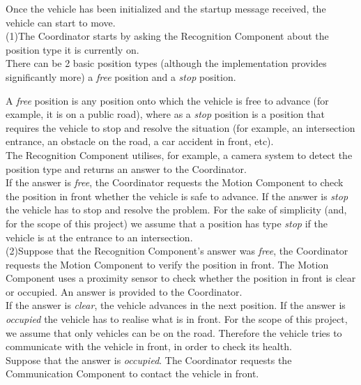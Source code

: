 \documentclass{memoir}
\begin{document}
Once the vehicle has been initialized and the startup message received, the vehicle can start to move. 
\\

(1)The Coordinator starts by asking the Recognition Component about the position type it is currently on. 
\\

There can be 2 basic position types (although the implementation provides significantly more) a \textit{free} position and a \textit{stop} position.

A \textit{free} position is any position onto which the vehicle is free to advance (for example, it is on a public road), where as a \textit{stop} position is a position that requires the vehicle to stop and resolve the situation (for example, an intersection entrance, an obstacle on the road, a 
car accident in front, etc).
\\

The Recognition Component utilises, for example, a camera system to detect the position type and returns an answer to the Coordinator.
\\

If the answer is \textit{free}, the Coordinator requests the Motion Component to check the position in front whether the vehicle is safe to advance.
If the answer is \textit{stop} the vehicle has to stop and resolve the problem. For the sake of simplicity (and, for the scope of this project) we assume that a position has type \textit{stop} if the vehicle is at the entrance to an intersection.
\\

 (2)Suppose that the Recognition Component's answer was \textit{free}, the Coordinator requests the Motion Component to verify the position in front. The Motion Component uses a proximity sensor to check whether the position in front is clear or occupied. An answer is provided to the Coordinator.
\\

If the answer is \textit{clear}, the vehicle advances in the next position. If the answer is \textit{occupied} the vehicle has to realise what is in front. For the scope of this project, we assume that only vehicles can be on the road. Therefore the vehicle tries to communicate with the vehicle in front, in order to check its health. 
\\

Suppose that the answer is \textit{occupied}. The Coordinator requests the Communication Component to contact the vehicle in front.
\\
\end{document}
